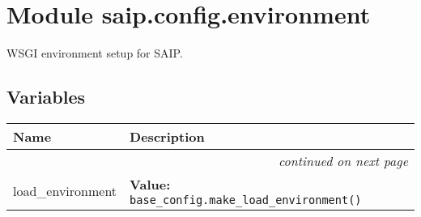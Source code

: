 %
%
%


\section{Module saip.config.environment}

    \label{saip:config:environment}
WSGI environment setup for SAIP.



  \subsection{Variables}

    \vspace{-1cm}
\hspace{\varindent}\begin{longtable}{|p{\varnamewidth}|p{\vardescrwidth}|l}
\cline{1-2}
\cline{1-2} \centering \textbf{Name} & \centering \textbf{Description}& \\
\cline{1-2}
\endhead\cline{1-2}\multicolumn{3}{r}{\small\textit{continued on next page}}\\\endfoot\cline{1-2}
\endlastfoot\raggedright l\-o\-a\-d\-\_\-e\-n\-v\-i\-r\-o\-n\-m\-e\-n\-t\- & \raggedright \textbf{Value:} 
{\tt base\_config.make\_load\_environment()}&\\
\cline{1-2}
\end{longtable}

